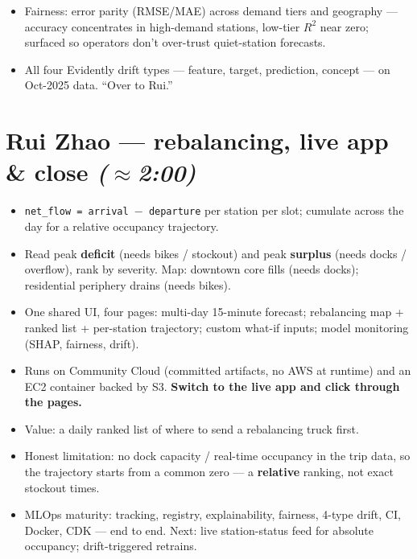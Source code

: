 \documentclass[11pt]{article}
\newcommand{\Rtwo}{$R^2$}
\newcommand{\presenter}[2]{\par\medskip\noindent{\color{#2}\rule{3pt}{12pt}}\hspace{4pt}{\bfseries #1}\par}
\newcommand{\timing}[1]{\hfill{\small\itshape\color{slate}(#1)}}
\begin{document}
\presenter{Slide 11 --- Fairness \& four-type drift}{blue}
\begin{itemize}
  \item Fairness: error parity (RMSE/MAE) across demand tiers and geography --- accuracy concentrates
        in high-demand stations, low-tier \Rtwo{} near zero; surfaced so operators don't over-trust
        quiet-station forecasts.
  \item All four Evidently drift types --- feature, target, prediction, concept --- on Oct-2025 data.
        ``Over to Rui.''
\end{itemize}

\section{Rui Zhao --- rebalancing, live app \& close \timing{$\approx$2:00}}
\presenter{Slide 12 --- Net-flow rebalancing layer}{purple}
\begin{itemize}
  \item \texttt{net\_flow = arrival $-$ departure} per station per slot; cumulate across the day for a
        relative occupancy trajectory.
  \item Read peak \textbf{deficit} (needs bikes / stockout) and peak \textbf{surplus} (needs docks /
        overflow), rank by severity. Map: downtown core fills (needs docks); residential periphery
        drains (needs bikes).
\end{itemize}

\presenter{Slide 13 --- The Streamlit app (live demo)}{purple}
\begin{itemize}
  \item One shared UI, four pages: multi-day 15-minute forecast; rebalancing map + ranked list +
        per-station trajectory; custom what-if inputs; model monitoring (SHAP, fairness, drift).
  \item Runs on Community Cloud (committed artifacts, no AWS at runtime) and an EC2 container backed by
        S3. \textbf{Switch to the live app and click through the pages.}
\end{itemize}

\presenter{Slide 14 --- Meaning, limitations, conclusion}{purple}
\begin{itemize}
  \item Value: a daily ranked list of where to send a rebalancing truck first.
  \item Honest limitation: no dock capacity / real-time occupancy in the trip data, so the trajectory
        starts from a common zero --- a \textbf{relative} ranking, not exact stockout times.
  \item MLOps maturity: tracking, registry, explainability, fairness, 4-type drift, CI, Docker, CDK ---
        end to end. Next: live station-status feed for absolute occupancy; drift-triggered retrains.
\end{itemize}
\end{document}
